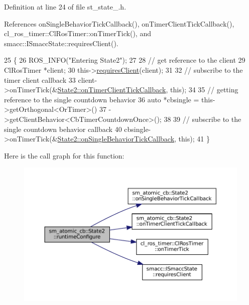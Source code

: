 Definition at line 24 of file st\+\_\+state\+\_.\+h.



References on\+Single\+Behavior\+Tick\+Callback(), on\+Timer\+Client\+Tick\+Callback(), cl\+\_\+ros\+\_\+timer\+::\+Cl\+Ros\+Timer\+::on\+Timer\+Tick(), and smacc\+::\+I\+Smacc\+State\+::requires\+Client().


\begin{DoxyCode}
25     \{
26         ROS\_INFO(\textcolor{stringliteral}{"Entering State2"});
27 
28         \textcolor{comment}{// get reference to the client}
29         ClRosTimer *client;
30         this->\hyperlink{classsmacc_1_1ISmaccState_a7f95c9f0a6ea2d6f18d1aec0519de4ac}{requiresClient}(client);
31 
32         \textcolor{comment}{// subscribe to the timer client callback}
33         client->onTimerTick(&\hyperlink{structsm__atomic__cb_1_1State2_a9367ee51725a8f2e8cdbf7d922cf9108}{State2::onTimerClientTickCallback}, \textcolor{keyword}{this});
34 
35          \textcolor{comment}{// getting reference to the single countdown behavior}
36         \textcolor{keyword}{auto} *cbsingle = this->getOrthogonal<OrTimer>()
37                              ->getClientBehavior<CbTimerCountdownOnce>();
38 
39         \textcolor{comment}{// subscribe to the single countdown behavior callback}
40         cbsingle->onTimerTick(&\hyperlink{structsm__atomic__cb_1_1State2_a4187898b6f6e82dd8f12770856fb8e24}{State2::onSingleBehaviorTickCallback}, \textcolor{keyword}{
      this});
41     \}
\end{DoxyCode}
Here is the call graph for this function\+:
\nopagebreak
\begin{figure}[H]
\begin{center}
\leavevmode
\includegraphics[width=350pt]{structsm__atomic__cb_1_1State2_a47560e2531cd7d9ae1ab2da6e7bc47d0_cgraph}
\end{center}
\end{figure}
\mbox{\label{structsm__atomic__cb_1_1State2_a51e882c506ec39461a039137f897f6d1}} 
